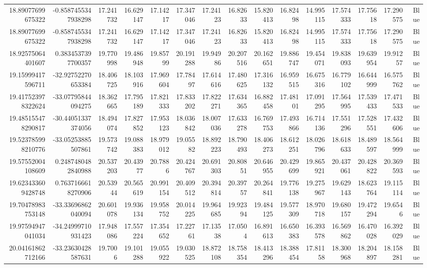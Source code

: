 \begin{center}
\begin{longtable}{rrrrrrrrrrrrrrr}
18.89077699675322 & -0.8587455347938298 & 17.241732 & 16.629147 & 17.14217 & 17.347046 & 17.24123 & 16.82633 & 15.820413 & 16.82498 & 14.995115 & 17.574333 & 17.75618 & 17.290575 & Blue \\
18.89077699675322 & -0.8587455347938298 & 17.241732 & 16.629147 & 17.14217 & 17.347046 & 17.24123 & 16.82633 & 15.820413 & 16.82498 & 14.995115 & 17.574333 & 17.75618 & 17.290575 & Blue \\
18.92575064401607 & 0.3834537397700357 & 19.770998 & 19.486948 & 19.85799 & 20.191288 & 19.94986 & 20.207516 & 20.162651 & 19.886747 & 19.454071 & 19.838093 & 19.639954 & 19.91257 & Blue \\
19.15999417596711 & -32.92752270653384 & 18.406725 & 18.103916 & 17.969604 & 17.78497 & 17.614616 & 17.480625 & 17.316132 & 16.959515 & 16.675316 & 16.779102 & 16.644999 & 16.575762 & Blue \\
19.417523978322624 & -33.07795844094275 & 18.362665 & 17.795189 & 17.821333 & 17.833202 & 17.822271 & 17.634365 & 16.882458 & 17.48101 & 17.091295 & 17.564995 & 17.539433 & 17.471533 & Blue \\
19.485155478290817 & -30.44051337374056 & 18.494074 & 17.827852 & 17.953123 & 18.036842 & 18.007036 & 17.633278 & 16.769753 & 17.493866 & 16.714136 & 17.551296 & 17.528551 & 17.432606 & Blue \\
19.523785998210776 & -33.05253885507861 & 19.573742 & 19.088383 & 18.979012 & 19.05582 & 18.892223 & 18.790493 & 18.406273 & 18.612251 & 18.026796 & 18.618633 & 18.489597 & 18.564999 & Blue \\
19.57552004108609 & 0.2487480482840988 & 20.537203 & 20.43977 & 20.7886 & 20.424767 & 20.691303 & 20.80851 & 20.646955 & 20.429699 & 19.865921 & 20.437061 & 20.428822 & 20.369593 & Blue \\
19.623433609428748 & 0.7637166618270906 & 20.53944 & 20.565619 & 20.991154 & 20.409512 & 20.394814 & 20.39757 & 20.264841 & 19.776138 & 19.275967 & 19.629143 & 18.623764 & 19.115114 & Blue \\
19.70478983753148 & -33.33696862040094 & 20.601078 & 19.936134 & 19.958752 & 20.014225 & 19.964685 & 19.92394 & 19.484125 & 19.577309 & 18.970718 & 19.680157 & 19.472294 & 19.6546 & Blue \\
19.97594947041034 & -34.24999710931423 & 17.948086 & 17.557224 & 17.354652 & 17.22761 & 17.13538 & 17.0504 & 16.891613 & 16.650383 & 16.393578 & 16.569862 & 16.470028 & 16.392029 & Blue \\
20.04161862712166 & -33.23630428587631 & 19.7006 & 19.101288 & 19.055922 & 19.030525 & 18.872108 & 18.758354 & 18.413296 & 18.388454 & 17.81158 & 18.300968 & 18.204897 & 18.158281 & Blue \\

\end{longtable}
\end{center}
